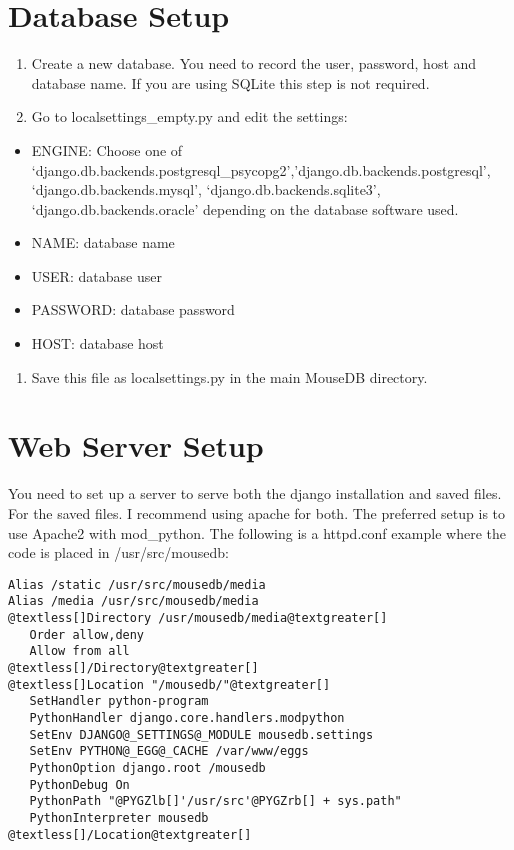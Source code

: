 \documentclass[letterpaper,10pt,english]{sphinxmanual}
\begin{document}
\section{Database Setup}
\begin{enumerate}
\item {} 
Create a new database.  You need to record the user, password, host and database name.  If you are using SQLite this step is not required.

\item {} 
Go to localsettings\_empty.py and edit the settings:

\end{enumerate}
\begin{itemize}
\item {} 
ENGINE: Choose one of `django.db.backends.postgresql\_psycopg2','django.db.backends.postgresql', `django.db.backends.mysql', `django.db.backends.sqlite3', `django.db.backends.oracle' depending on the database software used.

\item {} 
NAME: database name

\item {} 
USER: database user

\item {} 
PASSWORD: database password

\item {} 
HOST: database host

\end{itemize}
\begin{enumerate}
\item {} 
Save this file as localsettings.py in the main MouseDB directory.

\end{enumerate}


\section{Web Server Setup}

You need to set up a server to serve both the django installation and saved files.  For the saved files.  I recommend using apache for both.  The preferred setup is to use Apache2 with mod\_python.  The following is a httpd.conf example where the code is placed in /usr/src/mousedb:

\begin{Verbatim}[commandchars=@\[\]]
Alias /static /usr/src/mousedb/media
Alias /media /usr/src/mousedb/media
@textless[]Directory /usr/mousedb/media@textgreater[]
   Order allow,deny
   Allow from all
@textless[]/Directory@textgreater[]
@textless[]Location "/mousedb/"@textgreater[]
   SetHandler python-program
   PythonHandler django.core.handlers.modpython
   SetEnv DJANGO@_SETTINGS@_MODULE mousedb.settings
   SetEnv PYTHON@_EGG@_CACHE /var/www/eggs
   PythonOption django.root /mousedb
   PythonDebug On
   PythonPath "@PYGZlb[]'/usr/src'@PYGZrb[] + sys.path"
   PythonInterpreter mousedb
@textless[]/Location@textgreater[]
\end{Verbatim}
\end{document}
